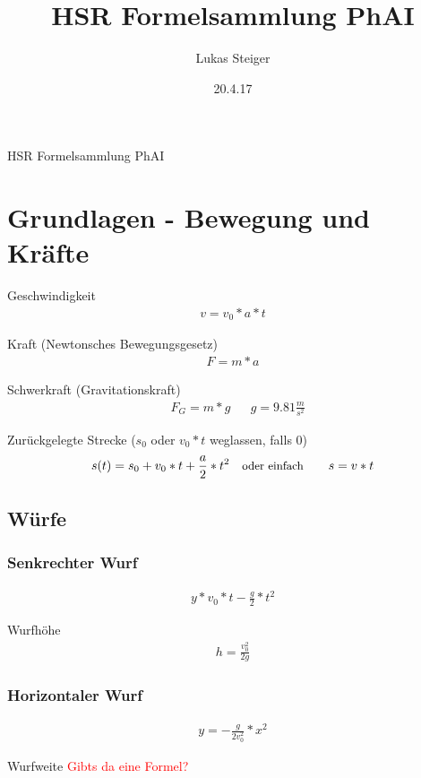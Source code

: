 \documentclass[17pt]{extarticle}
\author{Lukas Steiger}
\title{HSR Formelsammlung PhAI}
\date{20.4.17}
\begin{document}
\begin{center}
	\huge{HSR Formelsammlung PhAI}
\end{center}
	
\section{Grundlagen - Bewegung und Kräfte}

	Geschwindigkeit
	\begin{align}
		v = v_{0} * a * t
	\end{align}
	
	Kraft \small{(Newtonsches Bewegungsgesetz)}
	\begin{align}
		F = m * a
	\end{align}
	
	Schwerkraft \small{(Gravitationskraft)}
	\begin{align}
		&F_{G} = m * g
		&&g = 9.81 \frac{m}{s^{2}} 
	\end{align}
	
	Zurückgelegte Strecke \small{($s_{0}$ oder $v_{0}*t$ weglassen, falls 0)}
	\begin{align}
		&s(t) = s_{0} + v_{0} * t + \frac{a}{2} * t^{2}
		&&\text{\small{oder einfach}}
		&&&s = v * t
	\end{align}

	\subsection{Würfe}

	\subsubsection{Senkrechter Wurf}
	\begin{align}
		y * v_{0} * t - \frac{g}{2} * t^{2}
	\end{align}
	
	Wurfhöhe
	\begin{align}
		h = \frac{v_{0}^{2}}{2g}
	\end{align}
	
	\subsubsection{Horizontaler Wurf}
	\begin{align}
		y = - \frac{g}{2v_{0}^{2}} * x^{2}
	\end{align}
	
	Wurfweite
	\textcolor{red}{Gibts da eine Formel?}
	
\end{document}
